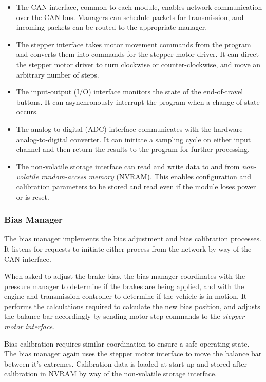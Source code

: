 \begin{itemize}

\item The CAN interface, common to each module, enables network communication over the CAN bus. Managers can schedule packets for transmission, and incoming packets can be routed to the appropriate manager.

\item The stepper interface takes motor movement commands from the program and converts them into commands for the stepper motor driver. It can direct the stepper motor driver to turn clockwise or counter-clockwise, and move an arbitrary number of steps.

\item The input-output (I/O) interface monitors the state of the end-of-travel buttons. It can asynchronously interrupt the program when a change of state occurs.

\item The analog-to-digital (ADC) interface communicates with the hardware analog-to-digital converter. It can initiate a sampling cycle on either input channel and then return the results to the program for further processing.

\item The non-volatile storage interface can read and write data to and from \emph{non-volatile random-access memory} (NVRAM). This enables configuration and calibration parameters to be stored and read even if the module loses power or is reset.

\end{itemize}

\subsubsection{Bias Manager}

The bias manager implements the bias adjustment and bias calibration processes. It listens for requests to initiate either process from the network by way of the CAN interface.

When asked to adjust the brake bias, the bias manager coordinates with the pressure manager to determine if the brakes are being applied, and with the engine and transmission controller to determine if the vehicle is in motion. It performs the calculations required to calculate the new bias position, and adjusts the balance bar accordingly by sending motor step commands to the \emph{stepper motor interface}.

Bias calibration requires similar coordination to ensure a safe operating state. The bias manager again uses the stepper motor interface to move the balance bar between it's extremes. Calibration data is loaded at start-up and stored after calibration in NVRAM by way of the non-volatile storage interface.

